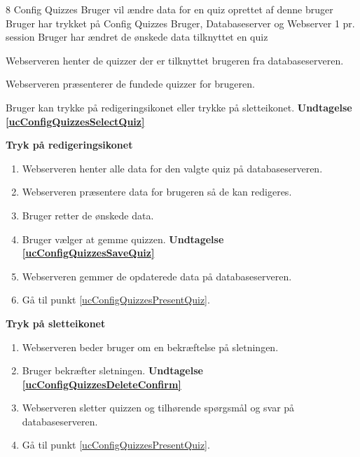 \uchead
	{8} %
	{Config Quizzes} %
	{Bruger vil ændre data for en quiz oprettet af denne bruger} %
	{Bruger har trykket på Config Quizzes} %
	{Bruger, Databaseserver og Webserver} %
	{} %
	{1 pr. session} %
	{Bruger har ændret de ønskede data tilknyttet en quiz} %


\item\label{ucConfigQuizzesPresentQuiz} Webserveren henter de quizzer der er tilknyttet brugeren fra databaseserveren.

\item Webserveren præsenterer de fundede quizzer for brugeren.

\item\label{ucConfigQuizzesSelectQuiz} Bruger kan trykke på redigeringsikonet eller trykke på sletteikonet. \textbf{Undtagelse \ref{ucConfigQuizzesSelectQuiz}}

\textbf{Tryk på redigeringsikonet}

	\begin{enumerate}
		\item Webserveren henter alle data for den valgte quiz på databaseserveren.
		
		\item Webserveren præsentere data for brugeren så de kan redigeres.
		
		\item Bruger retter de ønskede data.
		
		\item\label{ucConfigQuizzesSaveQuiz} Bruger vælger at gemme quizzen. \textbf{Undtagelse \ref{ucConfigQuizzesSaveQuiz}}
		
		\item Webserveren gemmer de opdaterede data på databaseserveren.
		
		\item Gå til punkt \ref{ucConfigQuizzesPresentQuiz}.
		
	\end{enumerate}

\textbf{Tryk på sletteikonet}
	
	\begin{enumerate}
		\item Webserveren beder bruger om en bekræftelse på sletningen.
		
		\item\label{ucConfigQuizzesDeleteConfirm} Bruger bekræfter sletningen. \textbf{Undtagelse \ref{ucConfigQuizzesDeleteConfirm}}
		
		\item Webserveren sletter quizzen og tilhørende spørgsmål og svar på databaseserveren.
		
		\item Gå til punkt \ref{ucConfigQuizzesPresentQuiz}.
		
	\end{enumerate}

